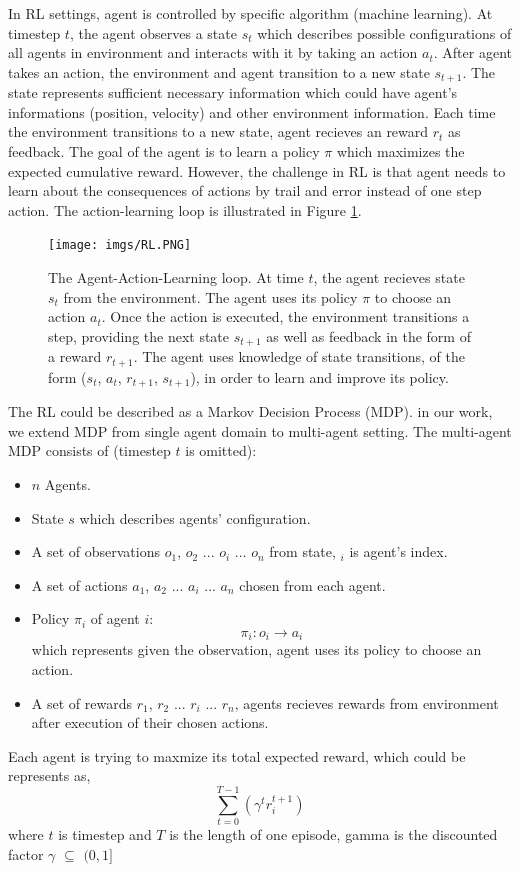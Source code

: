 \documentclass[11pt,twocolumn]{jarticle} %
\begin{document}
In RL settings, agent is controlled by specific algorithm (machine learning). At timestep $t$, the agent observes a state $s_t$ which describes possible configurations of all agents in environment and interacts with it by taking an action $a_t$. After agent takes an action, the environment and agent transition to a new state $s_{t+1}$. The state represents sufficient necessary information which could have agent's informations (position, velocity) and other environment information. Each time the environment transitions to a new state, agent recieves an reward $r_t$ as feedback. The goal of the agent is to learn a policy $\pi$ which maximizes the expected cumulative reward. However, the challenge in RL is that agent needs to learn about the consequences of actions by trail and error instead of one step action. The action-learning loop is illustrated in Figure \ref{fig:rl}. \par
\begin{figure}[h]
 \begin{center}
  \texttt{[image: imgs/RL.PNG]}
  \caption{
  The Agent-Action-Learning loop. At time $t$, the agent recieves state $s_t$ from the environment. The agent uses its policy $\pi$ to choose an action $a_t$. Once the action is executed, the environment transitions a step, providing the next state $s_{t+1}$ as well as feedback in the form of a reward $r_{t+1}$. The agent uses knowledge of state transitions, of the form ($s_t$, $a_t$, $r_{t+1}$, $s_{t+1}$), in order to learn and improve its policy.
  }
  \label{fig:rl}
 \end{center}
\end{figure}

The RL could be described as a Markov Decision Process (MDP). in our work, we extend MDP from single agent domain to multi-agent setting. The multi-agent MDP consists of (timestep $t$ is omitted):
\begin{itemize}
  \item $n$ Agents.
  \item State $s$ which describes agents' configuration.
  \item A set of observations $o_1$, $o_2$ ... $o_i$ ... $o_n$ from state, $_i$ is agent's index.
  \item A set of actions $a_1$, $a_2$ ... $a_i$ ... $a_n$ chosen from each agent.
  \item Policy $\pi_i$ of agent $i$: \[\pi_i: o_i \rightarrow a_i\] which represents given the observation, agent uses its policy to choose an action.
  \item A set of rewards $r_1$, $r_2$ ... $r_i$ ... $r_n$, agents recieves rewards from environment after execution of their chosen actions.
\end{itemize}
Each agent is trying to maxmize its total expected reward, which could be represents as,
\[ \sum_{t=0}^{T-1}(\gamma^t r_i^{t+1}) \]
where $t$ is timestep and $T$ is the length of one episode, gamma is the discounted factor $\gamma$ $\subseteq$ $(0, 1]$
\end{document}
